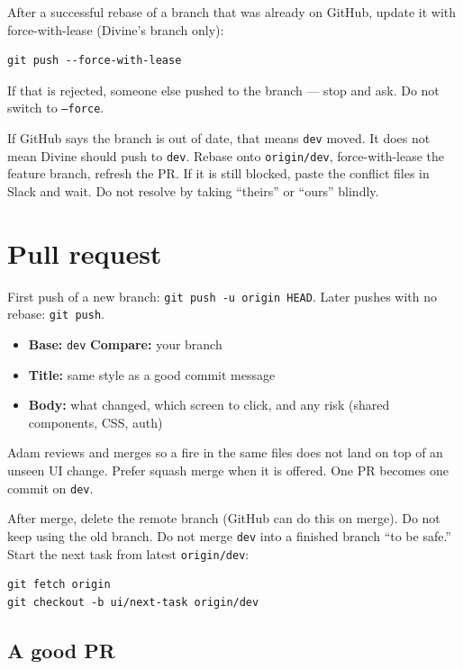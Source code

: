 \documentclass[11pt]{article}
\begin{document}
After a successful rebase of a branch that was already on GitHub, update it with force-with-lease (Divine's branch only):

\begin{Verbatim}[fontsize=\small,frame=single,framesep=5pt]
git push --force-with-lease
\end{Verbatim}

If that is rejected, someone else pushed to the branch --- stop and ask. Do not switch to \texttt{--force}.

If GitHub says the branch is out of date, that means \texttt{dev} moved. It does not mean Divine should push to \texttt{dev}. Rebase onto \texttt{origin/dev}, force-with-lease the feature branch, refresh the PR. If it is still blocked, paste the conflict files in Slack and wait. Do not resolve by taking ``theirs'' or ``ours'' blindly.

\section{Pull request}

First push of a new branch: \texttt{git push -u origin HEAD}. Later pushes with no rebase: \texttt{git push}.

\begin{itemize}
  \item \textbf{Base:} \texttt{dev} \quad \textbf{Compare:} your branch
  \item \textbf{Title:} same style as a good commit message
  \item \textbf{Body:} what changed, which screen to click, and any risk (shared components, CSS, auth)
\end{itemize}

Adam reviews and merges so a fire in the same files does not land on top of an unseen UI change. Prefer squash merge when it is offered. One PR becomes one commit on \texttt{dev}.

After merge, delete the remote branch (GitHub can do this on merge). Do not keep using the old branch. Do not merge \texttt{dev} into a finished branch ``to be safe.'' Start the next task from latest \texttt{origin/dev}:

\begin{Verbatim}[fontsize=\small,frame=single,framesep=5pt]
git fetch origin
git checkout -b ui/next-task origin/dev
\end{Verbatim}

\subsection*{A good PR}
\end{document}
